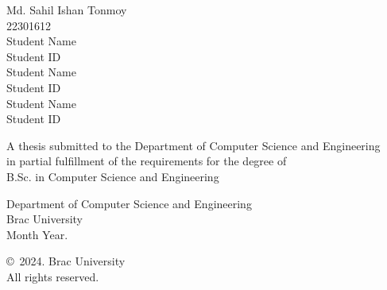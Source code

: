 \begin{titlepage}
\renewcommand*{\thepage}{Title} %

    \begin{center} 
        \vspace*{3cm} %
        
        {\fontsize{16pt}{22pt}\selectfont{Final Year Thesis/Project Report Template}
        } %
        
        \vspace{1.5cm}
        
        
        \vspace{0.5cm}
        
        	Md. Sahil Ishan Tonmoy\\
	        22301612\\
	        Student Name\\
	        Student ID\\
	        Student Name\\
	        Student ID\\
	        Student Name\\
	        Student ID

        \vspace{1.5cm}
        
        	A thesis submitted to the Department of Computer Science and Engineering\\
            in partial fulfillment of the requirements for the degree of\\
            B.Sc. in Computer Science and Engineering

        
        \vspace{2.5cm}
        
    		Department of Computer Science and Engineering\\
            Brac University\\
            Month Year.
        
        \vspace{3cm}
        
    		\copyright\ 2024. Brac University\\
            All rights reserved.
    
    \end{center}

\end{titlepage}